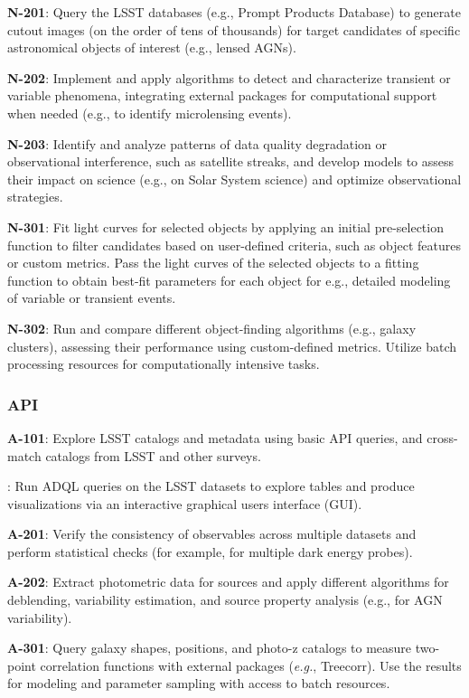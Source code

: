 \textbf{N-201}: Query the LSST databases (e.g., Prompt Products Database) to generate cutout images (on the order of tens of thousands) for target candidates of specific astronomical objects of interest (e.g., lensed AGNs).

\textbf{N-202}: Implement and apply algorithms to detect and characterize transient or variable phenomena, integrating external packages for computational support when needed (e.g., to identify microlensing events).

\textbf{N-203}: Identify and analyze patterns of data quality degradation or observational interference, such as satellite streaks, and develop models to assess their impact on science (e.g., on Solar System science) and optimize observational strategies.

\textbf{N-301}: Fit light curves for selected objects by applying an initial pre-selection function to filter candidates based on user-defined criteria, such as object features or custom metrics.
Pass the light curves of the selected objects to a fitting function to obtain best-fit parameters for each object for e.g.,  detailed modeling of variable or transient events. 

\textbf{N-302}: Run and compare different object-finding algorithms (e.g., galaxy clusters), assessing their performance using custom-defined metrics. Utilize batch processing resources for computationally intensive tasks.

\subsubsection{API}

\textbf{A-101}: Explore LSST catalogs and metadata using basic API queries, and cross-match catalogs from LSST and other surveys.

: Run ADQL queries on the LSST datasets to explore tables and produce visualizations via an interactive graphical users interface (GUI).

\textbf{A-201}: Verify the consistency of observables across multiple datasets and perform statistical checks (for example, for multiple dark energy probes). 

\textbf{A-202}: Extract photometric data for sources and apply different algorithms for deblending, variability estimation, and source property analysis (e.g., for AGN variability). 

\textbf{A-301}: Query galaxy shapes, positions, and photo-z catalogs to measure two-point correlation functions with external packages (\emph{e.g.}, Treecorr).
Use the results for modeling and parameter sampling with access to batch resources.

